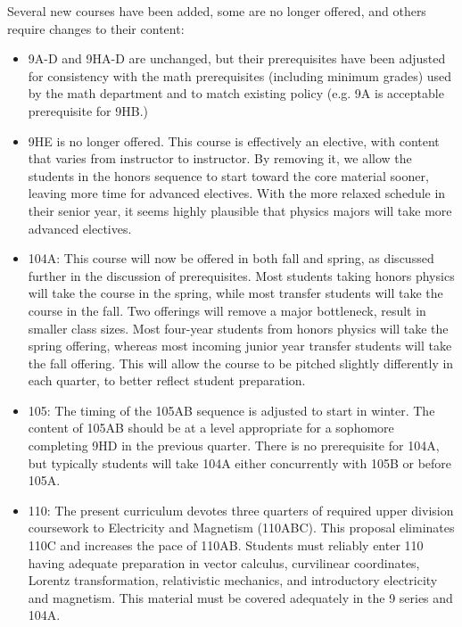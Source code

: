 \documentclass[12pt]{article}
\begin{document}
\vskip 2cm
Several new courses have been added, some are no longer offered, and
others require changes to their content:
\begin{itemize}

\item 9A-D and 9HA-D are unchanged, but their prerequisites have been
  adjusted for consistency with the math prerequisites (including
  minimum grades) used by the math department and to match existing
  policy (e.g. 9A is acceptable prerequisite for 9HB.)

\item 9HE is no longer offered.  This course is effectively an
  elective, with content that varies from instructor to instructor.
  By removing it, we allow the students in the honors sequence to
  start toward the core material sooner, leaving more time for
  advanced electives. With the more relaxed schedule in their senior
  year, it seems highly plausible that physics majors will take more
  advanced electives.

\item 104A: This course will now be offered in both fall and spring,
  as discussed further in the discussion of prerequisites.  Most
  students taking honors physics will take the course in the spring,
  while most transfer students will take the course in the fall.  Two
  offerings will remove a major bottleneck, result in smaller class
  sizes.  Most four-year students from honors physics will take the
  spring offering, whereas most incoming junior year transfer students
  will take the fall offering.  This will allow the course to be
  pitched slightly differently in each quarter, to better reflect
  student preparation.

\item 105: The timing of the 105AB sequence is adjusted to start in
  winter.  The content of 105AB should be at a level appropriate for a
  sophomore completing 9HD in the previous quarter.  There is no prerequisite for
  104A, but typically students will take 104A either concurrently with
  105B or before 105A.

\item 110: The present curriculum devotes three quarters of required
  upper division coursework to Electricity and Magnetism (110ABC).
  This proposal eliminates 110C and increases the pace of 110AB.
  Students must reliably enter 110 having adequate preparation in
  vector calculus, curvilinear coordinates, Lorentz transformation,
  relativistic mechanics, and introductory electricity and magnetism.
  This material must be covered adequately in the 9 series and 104A.


\end{itemize}
\end{document}
